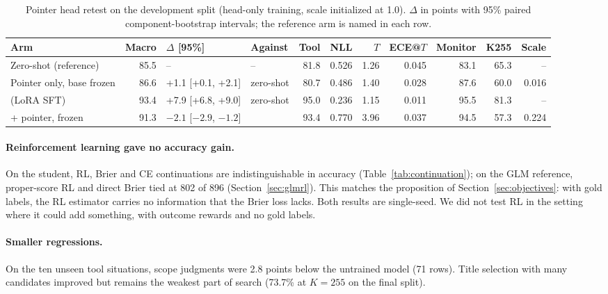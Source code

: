 \begin{table}[t]
\centering
\small
\caption{Pointer head retest on the development split (head-only training, scale initialized
at 1.0). $\Delta$ in points with 95\% paired component-bootstrap intervals; the reference arm
is named in each row.}
\label{tab:pointer}
\setlength{\tabcolsep}{3.5pt}
\begin{adjustbox}{max width=\linewidth}
\begin{tabular}{@{}lrllrrrrrrr@{}}
\toprule
Arm & Macro & $\Delta$ [95\%] & Against & Tool & NLL & $T$ & ECE@$T$ & Monitor & K255 & Scale \\
\midrule
Zero-shot (reference) & 85.5 & -- & -- & 81.8 & 0.526 & 1.26 & 0.045 & 83.1 & 65.3 & -- \\
Pointer only, base frozen & 86.6 & +1.1 [+0.1, +2.1] & zero-shot & 80.7 & 0.486 & 1.40 & 0.028 & 87.6 & 60.0 & 0.016 \\
\expone{} (LoRA SFT) & 93.4 & +7.9 [+6.8, +9.0] & zero-shot & 95.0 & 0.236 & 1.15 & 0.011 & 95.5 & 81.3 & -- \\
\expone{} + pointer, frozen & 91.3 & $-2.1$ [$-2.9$, $-1.2$] & \expone{} & 93.4 & 0.770 & 3.96 & 0.037 & 94.5 & 57.3 & 0.224 \\
\bottomrule
\end{tabular}
\end{adjustbox}
\end{table}

\paragraph{Reinforcement learning gave no accuracy gain.}
On the student, RL, Brier and CE continuations are indistinguishable in accuracy
(Table~\ref{tab:continuation}); on the GLM reference, proper-score RL and direct Brier tied at
802 of 896 (Section~\ref{sec:glmrl}). This matches the proposition of
Section~\ref{sec:objectives}: with gold labels, the RL estimator carries no information that
the Brier loss lacks. Both results are single-seed. We did not test RL in the setting where
it could add something, with outcome rewards and no gold labels.

\paragraph{Smaller regressions.}
On the ten unseen tool situations, scope judgments were 2.8 points below the untrained model
(71 rows). Title selection with many candidates improved but remains the weakest part of
search (73.7\% at $K=255$ on the final split).

